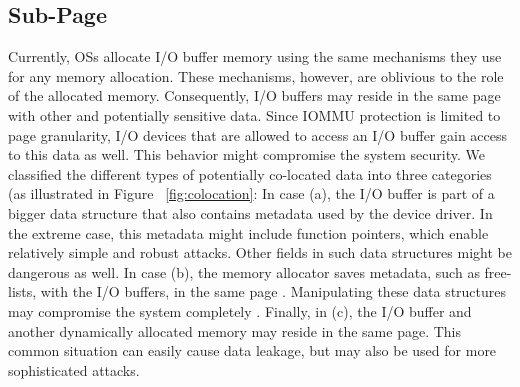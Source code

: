 \subsection{Sub-Page}\label{sec:subpage}
Currently, OSs allocate I/O buffer memory using the same mechanisms they use for any memory allocation. These mechanisms, however, are oblivious to the role of the allocated memory. Consequently, I/O buffers may reside in the same page with other and potentially sensitive data. Since IOMMU protection is limited to page granularity, I/O devices that are allowed to access an I/O buffer gain access to this data as well. This behavior might compromise the system security. We classified the different types of potentially co-located data into three categories (as illustrated in Figure ~\ref{fig:colocation}: In case (a), the I/O buffer is part of a bigger data structure that also contains metadata used by the device driver. In the extreme case, this metadata might include function pointers, which enable relatively simple and robust attacks. Other fields in such data structures might be dangerous as well. In case (b), the memory allocator saves metadata, such as free-lists, with the I/O buffers, in the same page \cite{Cor07}. Manipulating these data structures may compromise the system completely \cite{ak09}. Finally, in (c), the I/O buffer and another dynamically allocated memory may reside in the same page. This common situation can easily cause data leakage, but may also be used for more sophisticated attacks. 
